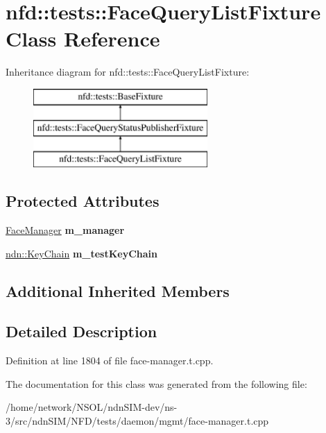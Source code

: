 \hypertarget{classnfd_1_1tests_1_1FaceQueryListFixture}{}\section{nfd\+:\+:tests\+:\+:Face\+Query\+List\+Fixture Class Reference}
\label{classnfd_1_1tests_1_1FaceQueryListFixture}
Inheritance diagram for nfd\+:\+:tests\+:\+:Face\+Query\+List\+Fixture\+:\begin{figure}[H]
\begin{center}
\leavevmode
\includegraphics[height=3.000000cm]{classnfd_1_1tests_1_1FaceQueryListFixture}
\end{center}
\end{figure}
\subsection*{Protected Attributes}
\begin{DoxyCompactItemize}
\item 
\hyperlink{classnfd_1_1FaceManager}{Face\+Manager} {\bfseries m\+\_\+manager}\hypertarget{classnfd_1_1tests_1_1FaceQueryListFixture_a0c3f4901a431f39abb5d3c2540d0a263}{}\label{classnfd_1_1tests_1_1FaceQueryListFixture_a0c3f4901a431f39abb5d3c2540d0a263}

\item 
\hyperlink{classndn_1_1security_1_1KeyChain}{ndn\+::\+Key\+Chain} {\bfseries m\+\_\+test\+Key\+Chain}\hypertarget{classnfd_1_1tests_1_1FaceQueryListFixture_a8f8f3ae4cff35e6fd295ff84e154ef94}{}\label{classnfd_1_1tests_1_1FaceQueryListFixture_a8f8f3ae4cff35e6fd295ff84e154ef94}

\end{DoxyCompactItemize}
\subsection*{Additional Inherited Members}


\subsection{Detailed Description}


Definition at line 1804 of file face-\/manager.\+t.\+cpp.



The documentation for this class was generated from the following file\+:\begin{DoxyCompactItemize}
\item 
/home/network/\+N\+S\+O\+L/ndn\+S\+I\+M-\/dev/ns-\/3/src/ndn\+S\+I\+M/\+N\+F\+D/tests/daemon/mgmt/face-\/manager.\+t.\+cpp\end{DoxyCompactItemize}
